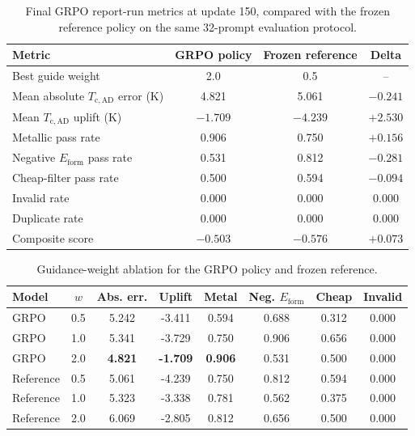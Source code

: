 \documentclass{article}
\newcommand{\Tcad}{T_{\mathrm{c,AD}}}
\newcommand{\Eform}{E_{\mathrm{form}}}
\begin{document}
\begin{table}[t]
\centering
\small
\setlength{\tabcolsep}{4pt}
\begin{tabular}{@{}lccc@{}}
\toprule
\textbf{Metric} & \textbf{GRPO policy} & \textbf{Frozen reference} & \textbf{Delta} \\
\midrule
Best guide weight & 2.0 & 0.5 & -- \\
Mean absolute $\Tcad$ error (K) & 4.821 & 5.061 & $-0.241$ \\
Mean $\Tcad$ uplift (K) & $-1.709$ & $-4.239$ & $+2.530$ \\
Metallic pass rate & 0.906 & 0.750 & $+0.156$ \\
Negative $\Eform$ pass rate & 0.531 & 0.812 & $-0.281$ \\
Cheap-filter pass rate & 0.500 & 0.594 & $-0.094$ \\
Invalid rate & 0.000 & 0.000 & 0.000 \\
Duplicate rate & 0.000 & 0.000 & 0.000 \\
Composite score & $-0.503$ & $-0.576$ & $+0.073$ \\
\bottomrule
\end{tabular}
\caption{Final GRPO report-run metrics at update 150, compared with the frozen reference policy on the same 32-prompt evaluation protocol.}
\label{tab:grpo_results}
\end{table}

\begin{table}[t]
\centering
\small
\setlength{\tabcolsep}{4pt}
\begin{tabular}{@{}lccccccc@{}}
\toprule
\textbf{Model} & \textbf{$w$} & \textbf{Abs. err.} & \textbf{Uplift} & \textbf{Metal} & \textbf{Neg. $\Eform$} & \textbf{Cheap} & \textbf{Invalid} \\
\midrule
GRPO & 0.5 & 5.242 & -3.411 & 0.594 & 0.688 & 0.312 & 0.000 \\
GRPO & 1.0 & 5.341 & -3.729 & 0.750 & 0.906 & 0.656 & 0.000 \\
GRPO & 2.0 & \textbf{4.821} & \textbf{-1.709} & \textbf{0.906} & 0.531 & 0.500 & 0.000 \\
Reference & 0.5 & 5.061 & -4.239 & 0.750 & 0.812 & 0.594 & 0.000 \\
Reference & 1.0 & 5.323 & -3.338 & 0.781 & 0.562 & 0.375 & 0.000 \\
Reference & 2.0 & 6.069 & -2.805 & 0.812 & 0.656 & 0.500 & 0.000 \\
\bottomrule
\end{tabular}
\caption{Guidance-weight ablation for the GRPO policy and frozen reference.}
\label{tab:guide_ablation}
\end{table}
\end{document}
